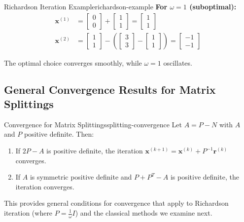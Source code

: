 \begin{example}{Richardson Iteration Example}{richardson-example}
    \textbf{For $\omega = 1$ (suboptimal):}
    \begin{align*}
        \mathbf{x}^{(1)} &= \begin{bmatrix} 0 \\ 0 \end{bmatrix} + \begin{bmatrix} 1 \\ 1 \end{bmatrix} = \begin{bmatrix} 1 \\ 1 \end{bmatrix} \\
        \mathbf{x}^{(2)} &= \begin{bmatrix} 1 \\ 1 \end{bmatrix} - \left(\begin{bmatrix} 3 \\ 3 \end{bmatrix} - \begin{bmatrix} 1 \\ 1 \end{bmatrix}\right) = \begin{bmatrix} -1 \\ -1 \end{bmatrix}
    \end{align*}

    The optimal choice converges smoothly, while $\omega = 1$ oscillates.
\end{example}

\subsection{General Convergence Results for Matrix Splittings}

\begin{theorem}{Convergence for Matrix Splittings}{splitting-convergence}
    Let $A = P - N$ with $A$ and $P$ positive definite. Then:
    \begin{enumerate}
        \item If $2P - A$ is positive definite, the iteration $\mathbf{x}^{(k+1)} = \mathbf{x}^{(k)} + P^{-1}\mathbf{r}^{(k)}$ converges.
        \item If $A$ is symmetric positive definite and $P + P^T - A$ is positive definite, the iteration converges.
    \end{enumerate}
\end{theorem}

This provides general conditions for convergence that apply to Richardson iteration (where $P = \frac{1}{\omega}I$) and the classical methods we examine next.

